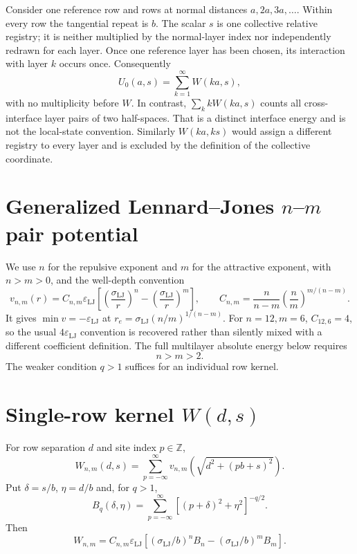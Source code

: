 \documentclass[11pt,letterpaper]{article}
\newcommand{\epsLJ}{\varepsilon_{\mathrm{LJ}}}
\newcommand{\sigLJ}{\sigma_{\mathrm{LJ}}}
\begin{document}
Consider one reference row and rows at normal distances $a,2a,3a,\ldots$.
Within every row the tangential repeat is $b$.  The scalar $s$ is one
collective relative registry; it is neither multiplied by the normal-layer
index nor independently redrawn for each layer.  Once one reference layer has
been chosen, its interaction with layer $k$ occurs once.  Consequently
\begin{equation}
 \boxed{U_0(a,s)=\sum_{k=1}^{\infty}W(ka,s),}
 \label{eq:U0count}
\end{equation}
with no multiplicity before $W$.  In contrast, $\sum_k kW(ka,s)$ counts all
cross-interface layer pairs of two half-spaces.  That is a distinct interface
energy and is not the local-state convention.  Similarly $W(ka,ks)$ would
assign a different registry to every layer and is excluded by the definition
of the collective coordinate.

\section{Generalized Lennard--Jones $n$--$m$ pair potential}
\label{sec:pair}

We use $n$ for the repulsive exponent and $m$ for the attractive exponent,
with $n>m>0$, and the well-depth convention
\begin{equation}
 \boxed{v_{n,m}(r)=C_{n,m}\epsLJ
 \left[\left(\frac{\sigLJ}{r}\right)^n-
       \left(\frac{\sigLJ}{r}\right)^m\right],\qquad
 C_{n,m}=\frac{n}{n-m}\left(\frac nm\right)^{m/(n-m)}.}
 \label{eq:pair}
\end{equation}
It gives $\min v=-\epsLJ$ at
$r_e=\sigLJ(n/m)^{1/(n-m)}$.  For $n=12,m=6$, $C_{12,6}=4$, so the usual
$4\epsLJ$ convention is recovered rather than silently mixed with a different
coefficient definition.  The full multilayer absolute energy below requires
\begin{equation}\boxed{n>m>2.}\label{eq:convergence}
\end{equation}
The weaker condition $q>1$ suffices for an individual row kernel.

\section{Single-row kernel $W(d,s)$}
\label{sec:row}

For row separation $d$ and site index $p\in\mathbb Z$,
\begin{equation}
 \boxed{W_{n,m}(d,s)=\sum_{p=-\infty}^{\infty}
 v_{n,m}\!\left(\sqrt{d^2+(pb+s)^2}\right).}
 \label{eq:W}
\end{equation}
Put $\delta=s/b$, $\eta=d/b$ and, for $q>1$,
\begin{equation}
 \boxed{B_q(\delta,\eta)=\sum_{p=-\infty}^{\infty}
 [(p+\delta)^2+\eta^2]^{-q/2}.}
 \label{eq:Bdirect}
\end{equation}
Then
\begin{equation}
 W_{n,m}=C_{n,m}\epsLJ\left[
 (\sigLJ/b)^nB_n-(\sigLJ/b)^mB_m\right].
 \label{eq:WB}
\end{equation}
\end{document}
